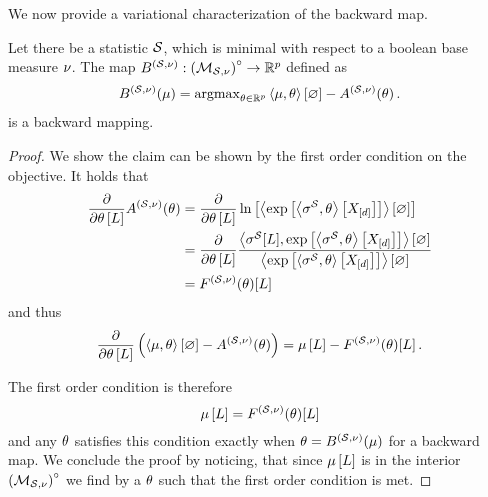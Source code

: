 
We now provide a variational characterization of the backward map.

\begin{theorem}
    \label{the:varBackward}
    Let there be a statistic $\mathcal{S}$, which is minimal with respect to a boolean base measure $\nu$.
    The map $B^{(\mathcal{S},\nu)}: {\left(\mathcal{M}_{\mathcal{S},\nu}\right)}^{\circ}\rightarrow\mathbb{R}^{p}$ defined as
    \begin{align*}
        B^{(\mathcal{S},\nu)}(\mu)
        = \mathrm{argmax}_{\theta\in\mathbb{R}^{p}}  \left\langle \mu,\theta\right\rangle \left[ \varnothing \right] - A^{(\mathcal{S},\nu)}(\theta) \, .
    \end{align*}
    is a backward mapping.
\end{theorem}
\begin{proof}
    We show the claim can be shown by the first order condition on the objective.
    It holds that
    \begin{align*}
        \frac{\partial }{\partial \theta\left[L\right]}  A^{(\mathcal{S},\nu)}(\theta)
        & = \frac{\partial }{\partial \theta\left[L\right]}  \ln \left[ \left\langle \mathrm{exp}\left[\left\langle \sigma^{\mathcal{S}},\theta\right\rangle \left[ X_{[d]} \right]\right]\right\rangle \left[ \varnothing \right] \right] \\
        & = \frac{\partial }{\partial \theta\left[L\right]} \frac{\left\langle \sigma^{\mathcal{S}}[L],\mathrm{exp}\left[\left\langle \sigma^{\mathcal{S}},\theta\right\rangle \left[ X_{[d]} \right]\right]\right\rangle \left[ \varnothing \right]}{\left\langle \mathrm{exp}\left[\left\langle \sigma^{\mathcal{S}},\theta\right\rangle \left[ X_{[d]} \right]\right]\right\rangle \left[ \varnothing \right]}   \\
        & = F^{(\mathcal{S},\nu)}(\theta)[L]
    \end{align*}
    and thus
    \begin{align*}
        \frac{\partial }{\partial \theta\left[L\right]} \left( \left\langle \mu,\theta\right\rangle \left[ \varnothing \right] - A^{(\mathcal{S},\nu)}(\theta)  \right)
        = \mu\left[L\right] -  F^{(\mathcal{S},\nu)}(\theta)[L] \, .
    \end{align*}

    The first order condition is therefore
    \[ \mu\left[L\right] =  F^{(\mathcal{S},\nu)}(\theta)[L] \]
    and any $\theta$ satisfies this condition exactly when $\theta=B^{(\mathcal{S},\nu)}(\mu)$ for a backward map.
    We conclude the proof by noticing, that since $\mu\left[L\right]$ is in the interior ${\left(\mathcal{M}_{\mathcal{S},\nu}\right)}^{\circ}$ we find by  a $\theta$ such that the first order condition is met.
\end{proof}


